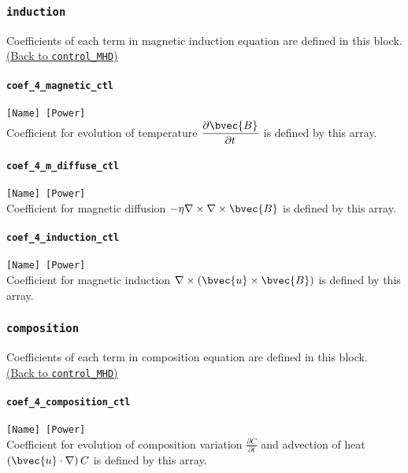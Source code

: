 \subsubsection{\tt induction}
\label{href_t:induction}
Coefficients of each term in magnetic induction equation are defined in this block. \\
\hyperref[href_i:induction]{(Back to {\tt control\_MHD})}

\paragraph{\tt coef\_4\_magnetic\_ctl}
\label{href_t:coef_4_magnetic_ctl}
\verb|[Name] [Power]| \\
Coefficient for evolution of temperature $\displaystyle \frac{\partial \bvec{B}}{\partial t}$ is defined by this array.

\paragraph{\tt coef\_4\_m\_diffuse\_ctl}
\label{href_t:coef_4_m_diffuse_ctl}
\verb|[Name] [Power]| \\
Coefficient for magnetic diffusion $ -\eta \nabla \times \nabla \times \bvec{B}$ is defined by this array.

\paragraph{\tt coef\_4\_induction\_ctl}
\label{href_t:coef_4_induction_ctl}
\verb|[Name] [Power]| \\
Coefficient for magnetic induction $\nabla \times \left(\bvec{u} \times \bvec{B} \right)$ is defined by this array.

\subsubsection{\tt composition}
\label{href_t:composition}
Coefficients of each term in composition equation are defined in this block. \\
\hyperref[href_i:composition]{(Back to {\tt control\_MHD})}

\paragraph{\tt coef\_4\_composition\_ctl}
\label{href_t:coef_4_composition_ctl}
\verb|[Name] [Power]| \\
Coefficient for evolution of composition variation $\displaystyle \frac{\partial C}{\partial t}$ and advection of heat $\left(\bvec{u} \cdot \nabla \right) C$ is defined by this array.


